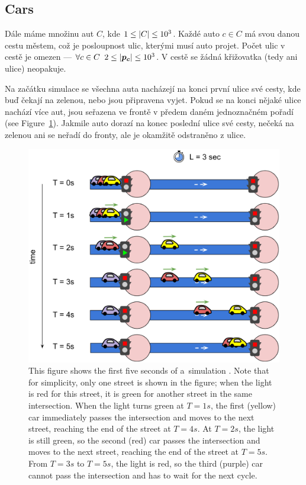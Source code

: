 \subsection{Cars}

Dále máme množinu aut $C$, kde $1 \leq \left|{C}\right| \leq 10^3$. Každé auto $c \in C$ má svou danou cestu městem, což je posloupnost ulic, kterými musí auto projet. Počet ulic v cestě je omezen --- $\forall c \in C \;\; 2 \leq \left|{\bm{p_c}}\right| \leq 10^3$. V cestě se žádná křižovatka (tedy ani ulice) neopakuje.

Na začátku simulace se všechna auta nacházejí na konci první ulice své cesty, kde buď čekají na zelenou, nebo jsou připravena vyjet. Pokud se na konci nějaké ulice nachází více aut, jsou seřazena ve frontě v předem daném jednoznačném pořadí (see Figure~\ref{fig:hashcode_street}). Jakmile auto dorazí na konec poslední ulice své cesty, nečeká na zelenou ani se neřadí do fronty, ale je okamžitě odstraněno z ulice.

\begin{figure}[ht] %
    \centering
    \includegraphics[width=\linewidth]{img/hashcode/figure3.png}
    \caption[Example of cars driving through a street]{
        This figure shows the first five seconds of a~simulation \cite{google_coding_competitions}.
        Note that for simplicity, only one street is shown in the figure; when the light is red for this street, it is green for another street in the same intersection.
        When the light turns green at $T=1s$, the first (yellow) car immediately passes the intersection and moves to the next street, reaching the end of the street at $T=4s$.
        At $T=2s$, the light is still green, so the second (red) car passes the intersection and moves to the next street, reaching the end of the street at $T=5s$.
        From $T=3s$ to $T=5s$, the light is red, so the third (purple) car cannot pass the intersection and has to wait for the next cycle.
    }
    \label{fig:hashcode_street}
\end{figure}

